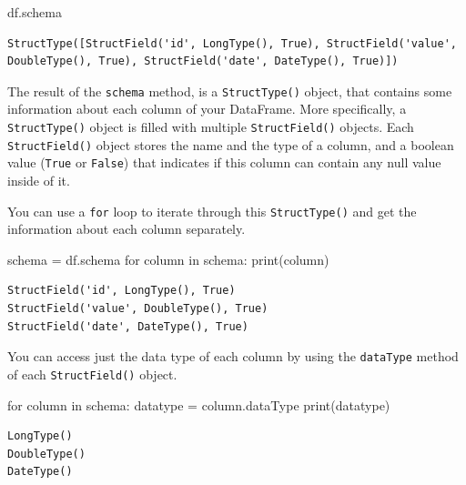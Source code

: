 \documentclass[
  11pt,
  letterpaper,
  DIV=11,
  numbers=noendperiod]{scrreprt}
\newenvironment{Shaded}{\begin{snugshade}}{\end{snugshade}}
\newcommand{\BuiltInTok}[1]{\textcolor[rgb]{0.00,0.23,0.31}{#1}}
\newcommand{\ControlFlowTok}[1]{\textcolor[rgb]{0.00,0.23,0.31}{#1}}
\newcommand{\KeywordTok}[1]{\textcolor[rgb]{0.00,0.23,0.31}{#1}}
\newcommand{\NormalTok}[1]{\textcolor[rgb]{0.00,0.23,0.31}{#1}}
\newcommand{\OperatorTok}[1]{\textcolor[rgb]{0.37,0.37,0.37}{#1}}
\begin{document}
\begin{Shaded}
\begin{Highlighting}[]
\NormalTok{df.schema}
\end{Highlighting}
\end{Shaded}

\begin{verbatim}
StructType([StructField('id', LongType(), True), StructField('value', DoubleType(), True), StructField('date', DateType(), True)])
\end{verbatim}

The result of the \texttt{schema} method, is a \texttt{StructType()}
object, that contains some information about each column of your
DataFrame. More specifically, a \texttt{StructType()} object is filled
with multiple \texttt{StructField()} objects. Each
\texttt{StructField()} object stores the name and the type of a column,
and a boolean value (\texttt{True} or \texttt{False}) that indicates if
this column can contain any null value inside of it.

You can use a \texttt{for} loop to iterate through this
\texttt{StructType()} and get the information about each column
separately.

\begin{Shaded}
\begin{Highlighting}[]
\NormalTok{schema }\OperatorTok{=}\NormalTok{ df.schema}
\ControlFlowTok{for}\NormalTok{ column }\KeywordTok{in}\NormalTok{ schema:}
  \BuiltInTok{print}\NormalTok{(column)}
\end{Highlighting}
\end{Shaded}

\begin{verbatim}
StructField('id', LongType(), True)
StructField('value', DoubleType(), True)
StructField('date', DateType(), True)
\end{verbatim}

You can access just the data type of each column by using the
\texttt{dataType} method of each \texttt{StructField()} object.

\begin{Shaded}
\begin{Highlighting}[]
\ControlFlowTok{for}\NormalTok{ column }\KeywordTok{in}\NormalTok{ schema:}
\NormalTok{  datatype }\OperatorTok{=}\NormalTok{ column.dataType}
  \BuiltInTok{print}\NormalTok{(datatype)}
\end{Highlighting}
\end{Shaded}

\begin{verbatim}
LongType()
DoubleType()
DateType()
\end{verbatim}
\end{document}
